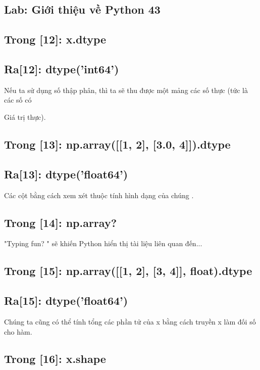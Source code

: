 \subsection{Lab: Giới thiệu về Python 43}

\subsection{Trong [12]: x.dtype}

\subsection{Ra[12]: dtype('int64')}

Nếu ta sử dụng số thập phân, thì ta sẽ thu được một mảng các số thực (tức là các số có

Giá trị thực).

\subsection{Trong [13]: np.array([[1, 2], [3.0, 4]]).dtype}

\subsection{Ra[13]: dtype('float64')}

Các cột bằng cách xem xét thuộc tính hình dạng của chúng .

\subsection{Trong [14]: np.array?}

"Typing fun? " sẽ khiến Python hiển thị tài liệu liên quan đến...

\subsection{Trong [15]: np.array([[1, 2], [3, 4]], float).dtype}

\subsection{Ra[15]: dtype('float64')}

Chúng ta cũng có thể tính tổng các phần tử của x bằng cách truyền x làm đối số cho hàm.

\subsection{Trong [16]: x.shape}

